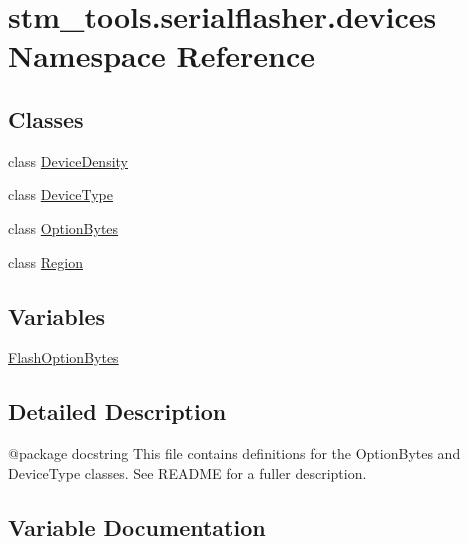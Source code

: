 \hypertarget{namespacestm__tools_1_1serialflasher_1_1devices}{}\section{stm\+\_\+tools.\+serialflasher.\+devices Namespace Reference}
\label{namespacestm__tools_1_1serialflasher_1_1devices}
\subsection*{Classes}
\begin{DoxyCompactItemize}
\item 
class \hyperlink{classstm__tools_1_1serialflasher_1_1devices_1_1DeviceDensity}{Device\+Density}
\item 
class \hyperlink{classstm__tools_1_1serialflasher_1_1devices_1_1DeviceType}{Device\+Type}
\item 
class \hyperlink{classstm__tools_1_1serialflasher_1_1devices_1_1OptionBytes}{Option\+Bytes}
\item 
class \hyperlink{classstm__tools_1_1serialflasher_1_1devices_1_1Region}{Region}
\end{DoxyCompactItemize}
\subsection*{Variables}
\begin{DoxyCompactItemize}
\item 
\hyperlink{namespacestm__tools_1_1serialflasher_1_1devices_a929ea6db15a8a354b2e498af7e7caf7e}{Flash\+Option\+Bytes}
\end{DoxyCompactItemize}


\subsection{Detailed Description}
\begin{DoxyVerb}@package docstring
This file contains definitions for the OptionBytes and DeviceType classes. See README for 
a fuller description.\end{DoxyVerb}
 

\subsection{Variable Documentation}
\mbox{\label{namespacestm__tools_1_1serialflasher_1_1devices_a929ea6db15a8a354b2e498af7e7caf7e}} 
